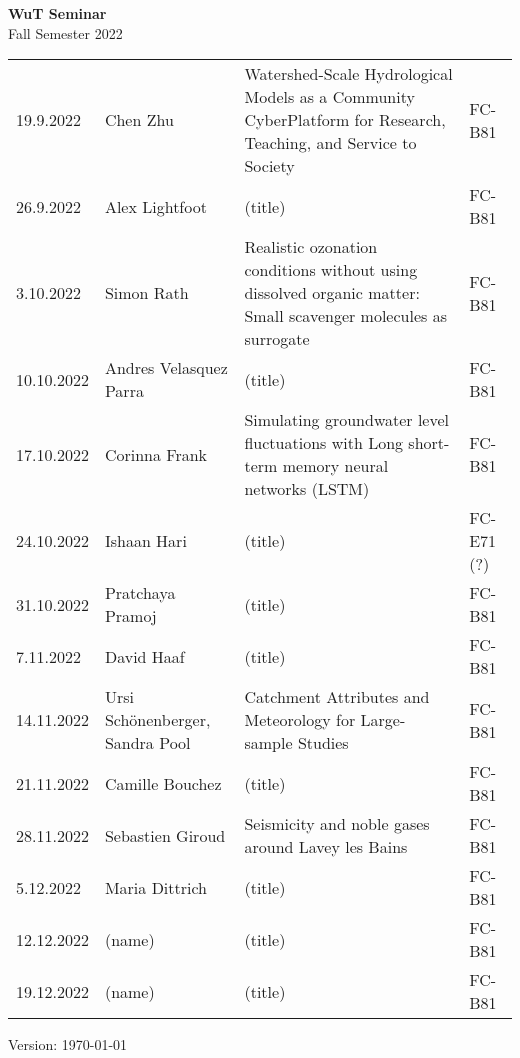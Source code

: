 \documentclass[12pt]{article}
\begin{document}
\centering

{\Huge \bf WuT Seminar}\\[1cm]
{\Large Fall Semester 2022}\\[1.8cm]





\renewcommand*\arraystretch{1.4}
\begin{tabular}{l p{3.8cm} p{8.5cm} p{2cm}}

19.9.2022
 	& Chen Zhu
 	& Watershed-Scale Hydrological Models as a Community CyberPlatform for Research, Teaching, and Service to Society
  & FC-B81\\
  
26.9.2022
 	& Alex Lightfoot
 	& (title)
 	& FC-B81\\

3.10.2022
 	& Simon Rath
 	& Realistic ozonation conditions without using dissolved organic matter: Small scavenger molecules as surrogate
 	& FC-B81\\

10.10.2022
 	& Andres Velasquez Parra
 	& (title)
 	& FC-B81\\

17.10.2022  
 	& Corinna Frank
 	& Simulating groundwater level fluctuations with Long short-term memory neural networks (LSTM)
 	& FC-B81\\
 	
24.10.2022
 	& Ishaan Hari
 	& (title)
 	& FC-E71 (?)\\

31.10.2022
 	& Pratchaya Pramoj
 	& (title)
 	& FC-B81\\

7.11.2022
 	& David Haaf
 	& (title)
 	& FC-B81\\

14.11.2022
 	& Ursi Schönenberger, Sandra Pool
 	& Catchment Attributes and Meteorology for Large-sample Studies
 	& FC-B81\\

21.11.2022
 	& Camille Bouchez
 	& (title)
 	& FC-B81\\

28.11.2022
 	& Sebastien Giroud
 	& Seismicity and noble gases around Lavey les Bains
 	& FC-B81\\

5.12.2022
 	& Maria Dittrich
 	& (title)
 	& FC-B81\\

12.12.2022
 	& (name)
 	& (title)
 	& FC-B81\\

19.12.2022
 	& (name)
 	& (title)
 	& FC-B81\\


\end{tabular}

\vfill

{\scriptsize Version: \today}
\end{document}
